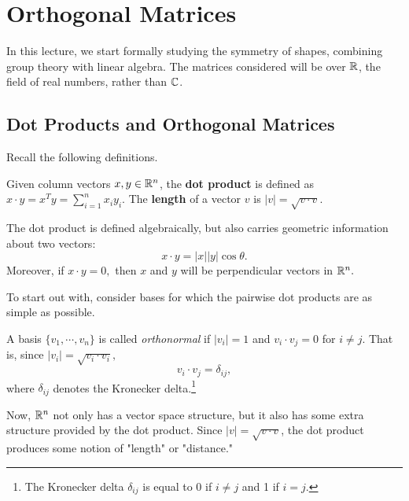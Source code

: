 
\section{Orthogonal Matrices}

In this lecture, we start formally studying the symmetry of shapes, combining group theory with linear algebra. The matrices considered will be over $\mathbb R$, the field of real numbers, rather than $\mathbb C$.

\subsection{Dot Products and Orthogonal Matrices}


Recall the following definitions.
\begin{definition}
    Given column vectors $x, y \in \mathbb R^n$, the \textbf{dot product} is defined as $x \cdot y = x^T y = \sum_{i=1}^n x_i y_i$. The \textbf{length} of a vector $v$ is $|v| = \sqrt{v \cdot v}.$
\end{definition}

The dot product is defined algebraically, but also carries geometric information about two vectors: \[x \cdot y = |x||y|\cos\theta.\] Moreover, if $x \cdot y = 0,$ then $x$ and $y$ will be perpendicular vectors in $\mathbb R^n.$

To start out with, consider bases for which the pairwise dot products are as simple as possible.
\begin{definition}
    A basis $\{v_1, \cdots, v_n\}$ is called \emph{orthonormal} if $|v_i| = 1$ and $v_i \cdot v_j = 0$ for $i \neq j.$ That is, since $|v_i| = \sqrt{v_i \cdot v_i},$ \[v_i \cdot v_j = \delta_{ij},\] where $\delta_{ij}$ denotes the Kronecker delta.\footnote{The Kronecker delta $\delta_{ij}$ is equal to 0 if $i \neq j$ and 1 if $i = j.$}
    
\end{definition}

Now, $\mathbb R^n$ not only has a vector space structure, but it also has some extra structure provided by the dot product. Since $|v| = \sqrt{v \cdot v}$, the dot product produces some notion of "length" or "distance." 


